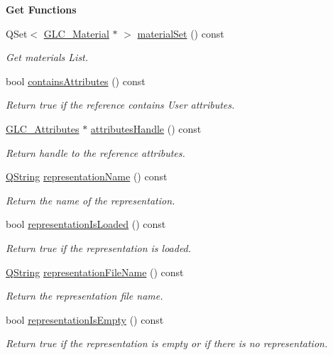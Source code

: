 \begin{Indent}{\bf Get Functions}
\begin{DoxyCompactItemize}
Q\-Set$<$ \hyperlink{class_g_l_c___material}{G\-L\-C\-\_\-\-Material} $\ast$ $>$ \hyperlink{class_g_l_c___struct_reference_ae35676759d4117f6454aa87b008c5123}{material\-Set} () const 
\begin{DoxyCompactList}\small\item\em Get materials List. \end{DoxyCompactList}\item 
bool \hyperlink{class_g_l_c___struct_reference_acff0d6394c468f731f7de7447e8d51c2}{contains\-Attributes} () const 
\begin{DoxyCompactList}\small\item\em Return true if the reference contains User attributes. \end{DoxyCompactList}\item 
\hyperlink{class_g_l_c___attributes}{G\-L\-C\-\_\-\-Attributes} $\ast$ \hyperlink{class_g_l_c___struct_reference_a558c2751608d365d8683735189b220d3}{attributes\-Handle} () const 
\begin{DoxyCompactList}\small\item\em Return handle to the reference attributes. \end{DoxyCompactList}\item 
\hyperlink{group___u_a_v_objects_plugin_gab9d252f49c333c94a72f97ce3105a32d}{Q\-String} \hyperlink{class_g_l_c___struct_reference_a7e22df9ce3efffb1f3d2a5a2ac3ca168}{representation\-Name} () const 
\begin{DoxyCompactList}\small\item\em Return the name of the representation. \end{DoxyCompactList}\item 
bool \hyperlink{class_g_l_c___struct_reference_a5301693c3a2c0e34936c42bce7b0292f}{representation\-Is\-Loaded} () const 
\begin{DoxyCompactList}\small\item\em Return true if the representation is loaded. \end{DoxyCompactList}\item 
\hyperlink{group___u_a_v_objects_plugin_gab9d252f49c333c94a72f97ce3105a32d}{Q\-String} \hyperlink{class_g_l_c___struct_reference_a25a3b5217d51f3176e46f8ed8a55673d}{representation\-File\-Name} () const 
\begin{DoxyCompactList}\small\item\em Return the representation file name. \end{DoxyCompactList}\item 
bool \hyperlink{class_g_l_c___struct_reference_a565802ffaf11704bd33861b86db01c59}{representation\-Is\-Empty} () const 
\begin{DoxyCompactList}\small\item\em Return true if the representation is empty or if there is no representation. \end{DoxyCompactList}\end{DoxyCompactItemize}
\end{Indent}
